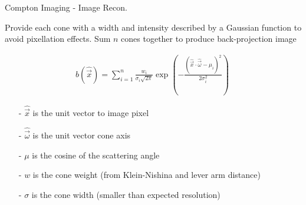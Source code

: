 \documentclass[xcolor=x11names,compress]{beamer}
\renewcommand{\(}{\begin{columns}}
\renewcommand{\)}{\end{columns}}
\newcommand{\<}[1]{\begin{column}{#1}}
\renewcommand{\>}{\end{column}}
\begin{document}
\begin{frame}{Compton Imaging - Image Recon.}

Provide each cone with a width and intensity described by a Gaussian function to avoid pixellation effects. Sum $n$ cones together to produce back-projection image \cite{Haefner}

\begin{align*}
b(\hat{\vec{x}}) = \sum_{i=1}^n \frac{w_i}{\sigma_i \sqrt{2\pi}} \exp\left( -\frac{(\hat{\vec{x}} \cdot \hat{\vec{\omega}} - \mu_i)^2}{2\sigma_i^2} \right)\
\end{align*}

\begin{itemize}
\small
\item[-] $\hat{\vec{x}}$ is the unit vector to image pixel
\item[-] $\hat{\vec{\omega}}$ is the unit vector cone axis
\item[-] $\mu$ is the cosine of the scattering angle
\item[-] $w$ is the cone weight (from Klein-Nishina and lever arm distance)
\item[-] $\sigma$ is the cone width (smaller than expected resolution)
\end{itemize}

\end{frame}
\end{document}
